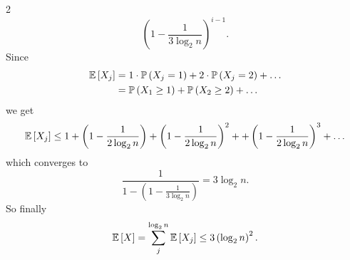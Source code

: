\documentclass[a4paper,9pt]{extarticle}
\begin{document}
\begin{multicols*}{2}
	\begin{equation*}
		\left(1-\frac{1}{3\log_{2}n}\right)^{i-1}.
	\end{equation*}
	Since
	\begin{align*}
		\mathbb{E}\left[X_{j}\right]&=1\cdot\mathbb{P}\left(X_{j}=1\right)+2\cdot\mathbb{P}\left(X_{j}=2\right)+\ldots\\
		&=\mathbb{P}\left(X_{1}\geq 1\right)+\mathbb{P}\left(X_{2}\geq 2\right)+\ldots
	\end{align*}
	we get
	\begin{equation*}
		\mathbb{E}\left[X_{j}\right]\leq1+\left(1-\frac{1}{2\log_{2}n}\right)+\left(1-\frac{1}{2\log_{2}n}\right)^{2}++\left(1-\frac{1}{2\log_{2}n}\right)^{3}+\ldots
	\end{equation*}
	which converges to
	\begin{equation*}
		\frac{1}{1-\left(1-\frac{1}{3\log_{2}n}\right)}=3\log_{2}n.
	\end{equation*}
	So finally
	\begin{equation*}
		\mathbb{E}\left[X\right]=\sum_{j}^{\log_{2}n}\mathbb{E}\left[X_{j}\right]\leq3\left(\log_{2}n\right)^{2}.
	\end{equation*}

\end{multicols*}
\end{document}
